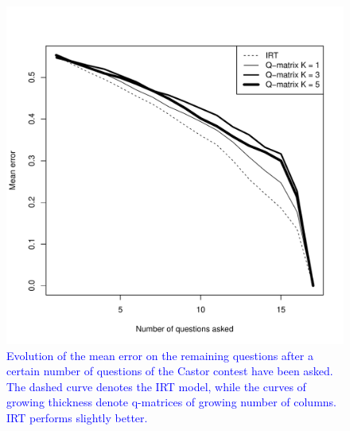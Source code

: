 \documentclass{sig-alternate}
\newcommand\note[1]{\textcolor{blue}{#1}}
\begin{document}

\begin{figure}
\includegraphics[width=\linewidth]{castor.pdf}
\caption{\note{Evolution of the mean error on the remaining questions after a certain number of questions of the Castor contest have been asked. The dashed curve denotes the IRT model, while the curves of growing thickness denote q-matrices of growing number of columns. IRT performs slightly better.}}
\label{fig:castor}
\end{figure}
\end{document}
